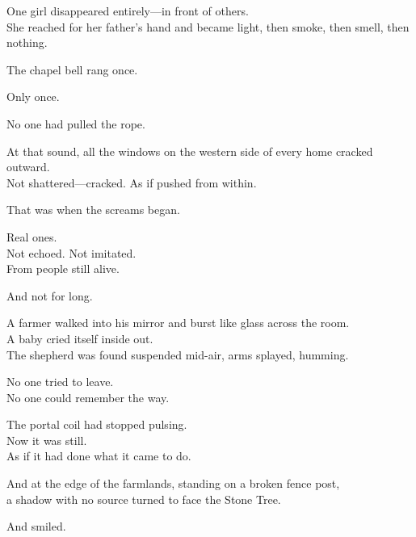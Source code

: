 \documentclass[12pt]{article}
\begin{document}
\vspace{0.5em}
One girl disappeared entirely---in front of others.\\
She reached for her father’s hand and became light, then smoke, then smell, then nothing.

\vspace{0.5em}
The chapel bell rang once.

\vspace{0.5em}
Only once.

\vspace{0.5em}
No one had pulled the rope.

\vspace{0.5em}
At that sound, all the windows on the western side of every home cracked outward.\\
Not shattered---cracked. As if pushed from within.

\vspace{0.5em}
That was when the screams began.

\vspace{0.5em}
Real ones.\\
Not echoed. Not imitated.\\
From people still alive.

\vspace{0.5em}
And not for long.

\vspace{0.5em}
A farmer walked into his mirror and burst like glass across the room.\\
A baby cried itself inside out.\\
The shepherd was found suspended mid-air, arms splayed, humming.

\vspace{0.5em}
No one tried to leave.\\
No one could remember the way.

\vspace{0.5em}
The portal coil had stopped pulsing.\\
Now it was still.\\
As if it had done what it came to do.

\vspace{0.5em}
And at the edge of the farmlands, standing on a broken fence post,\\
a shadow with no source turned to face the Stone Tree.

\vspace{0.5em}
And smiled.

\dotfill
\end{document}
